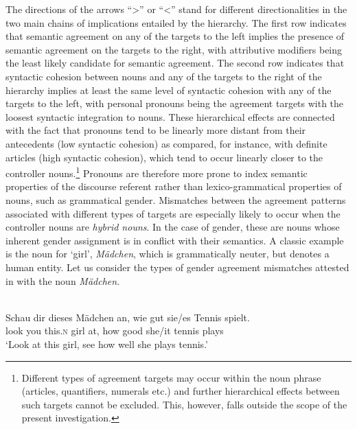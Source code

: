 \documentclass[output=collectionpaper]{langsci/langscibook}
\begin{document}
The directions of the arrows \textendash{} ``{\textgreater}'' or ``{\textless}'' \textendash{} stand for different directionalities in the two main chains of implications entailed by the hierarchy. The first row indicates that semantic agreement on any of the targets to the left implies the presence of semantic agreement on the targets to the right, with attributive modifiers being the least likely candidate for semantic agreement. The second row  indicates that syntactic cohesion between nouns and any of the targets to the right of the hierarchy implies at least the same level of syntactic cohesion with any of the targets to the left, with personal pronouns being the agreement targets with the loosest syntactic integration to nouns.
These hierarchical effects are connected with the fact that pronouns tend to be linearly more distant from their antecedents (low syntactic cohesion) as compared, for instance, with definite articles (high syntactic cohesion), which tend to occur linearly closer to the controller nouns.\footnote{Different types of agreement targets may occur within the noun phrase (articles, quantifiers, numerals etc.\@) and further hierarchical effects between such targets cannot be excluded. This, however, falls outside the scope of the present investigation.} Pronouns are therefore more prone to index semantic properties of the discourse referent rather than lexico-grammatical properties of nouns, such as grammatical gender. Mismatches between the agreement patterns associated with different types of targets are especially likely to occur when the controller nouns are \textit{hybrid nouns}. In the case of gender, these are nouns whose inherent gender assignment is in conflict with their semantics. A classic example is the  noun for `girl', \textit{M\"adchen}, which is grammatically neuter, but denotes a human entity. Let us consider the types of gender agreement mismatches attested in  with the noun \textit{M\"adchen}.


\ea\label{ex:dgm:2:madchen}
\\
\gll Schau dir dieses Mädchen an, wie gut sie/es Tennis spielt.\\
     look you this.\textsc{n} girl at, how good she/it tennis plays\\
\glt `Look at this girl, see how well she plays tennis.'\\
\z
\end{document}
